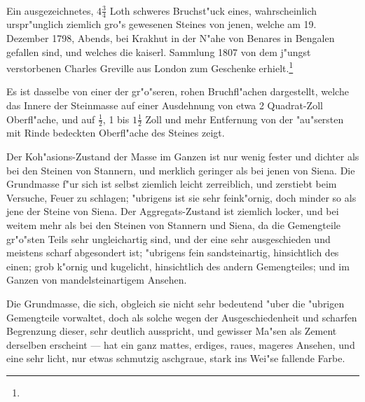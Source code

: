 \documentclass[a4paper, 11pt, oneside, german]{article}
\begin{document}
\paragraph{}
Ein ausgezeichnetes, $4\frac{3}{4}$ Loth schweres Bruchst"uck eines, wahrscheinlich urspr"unglich ziemlich gro"s gewesenen Steines von jenen, welche am 19. Dezember 1798, Abends, bei Krakhut in der N"ahe von Benares in Bengalen gefallen sind, und welches die kaiserl. Sammlung 1807 von dem j"ungst verstorbenen Charles Greville aus London zum Geschenke erhielt.\footnote{}

Es ist dasselbe von einer der gr"o"seren, rohen Bruchfl"achen dargestellt, welche das Innere der Steinmasse auf einer Ausdehnung von etwa 2 Quadrat-Zoll Oberfl"ache, und auf $\frac{1}{2}$, 1 bis $1\frac{1}{2}$ Zoll und mehr Entfernung von der "au"sersten mit Rinde bedeckten Oberfl"ache des Steines zeigt.

Der Koh"asions-Zustand der Masse im Ganzen ist nur wenig fester und dichter als bei den Steinen von Stannern, und merklich geringer als bei jenen von Siena. Die Grundmasse f"ur sich ist selbst ziemlich leicht zerreiblich, und zerstiebt beim Versuche, Feuer zu schlagen; "ubrigens ist sie sehr feink"ornig, doch minder so als jene der Steine von Siena. Der Aggregats-Zustand ist ziemlich locker, und bei weitem mehr als bei den Steinen von Stannern und Siena, da die Gemengteile gr"o"sten Teils sehr ungleichartig sind, und der eine sehr ausgeschieden und meistens scharf abgesondert ist; "ubrigens fein sandsteinartig, hinsichtlich des einen; grob k"ornig und kugelicht, hinsichtlich des andern Gemengteiles; und im Ganzen von mandelsteinartigem Ansehen.

Die Grundmasse, die sich, obgleich sie nicht sehr bedeutend "uber die "ubrigen Gemengteile vorwaltet, doch als solche wegen der Ausgeschiedenheit und scharfen Begrenzung dieser, sehr deutlich ausspricht, und gewisser Ma"sen als Zement derselben erscheint --- hat ein ganz mattes, erdiges, raues, mageres Ansehen, und eine sehr licht, nur etwas schmutzig aschgraue, stark ins Wei"se fallende Farbe.
\end{document}
